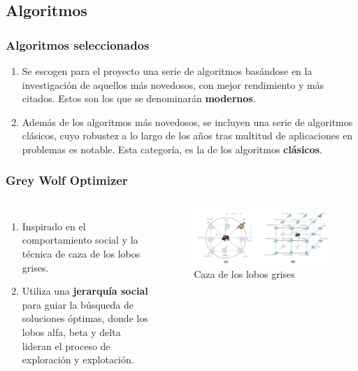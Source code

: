 \note{

}

\subsection{Algoritmos}
\begin{frame}
  \frametitle{Algoritmos seleccionados}
  \begin{enumerate}
    \item Se escogen para el proyecto una serie de algoritmos basándose en la investigación de aquellos más novedosos, con mejor rendimiento y más citados. Estos son los que se denominarán \textbf{modernos}.
    \item Además de los algoritmos más novedosos, se incluyen una serie de algoritmos clásicos, cuyo robustez a lo largo de los años tras multitud de aplicaciones en problemas es notable. Esta categoría, es la de los algoritmos \textbf{clásicos}.
  \end{enumerate}
\end{frame}

\begin{frame}
  \frametitle{Grey Wolf Optimizer}
  \begin{columns}
    \begin{enumerate}
      \item Inspirado en el comportamiento social y la técnica de caza de los lobos grises.
      \item Utiliza una \textbf{jerarquía social} para guiar la búsqueda de soluciones óptimas, donde los lobos alfa, beta y delta lideran el proceso de exploración y explotación.
    \end{enumerate}
    \begin{figure}
      \begin{center}
        \includegraphics[width=\textwidth]{imagenes/chapter3/grey-wolf-hunt.png}
      \end{center}
      \caption{Caza de los lobos grises \footnotemark[4]}
    \end{figure}
  \end{columns}
\end{frame}

